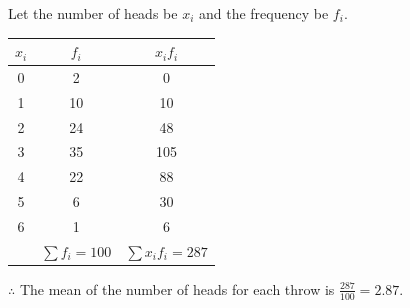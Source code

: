 \documentclass{report}
\begin{document}
\begin{multicols}{2}
\begin{enumerate}
          Let the number of heads be $x_i$ and the frequency be $f_i$.
          \begin{center}
            \begin{tabular}{|c|c|c|}
              \hline
              $x_i$ & $f_i$            & $x_i f_i$           \\
              \hline
              0     & 2                & 0                   \\
              1     & 10               & 10                  \\
              2     & 24               & 48                  \\
              3     & 35               & 105                 \\
              4     & 22               & 88                  \\
              5     & 6                & 30                  \\
              6     & 1                & 6                   \\
              \hline
                    & $\sum f_i = 100$ & $\sum x_i f_i= 287$ \\
              \hline
            \end{tabular}
          \end{center}
          $\therefore$ The mean of the number of heads for each throw is $\frac{287}{100} = 2.87$.


\end{enumerate}
\end{multicols}
\end{document}
